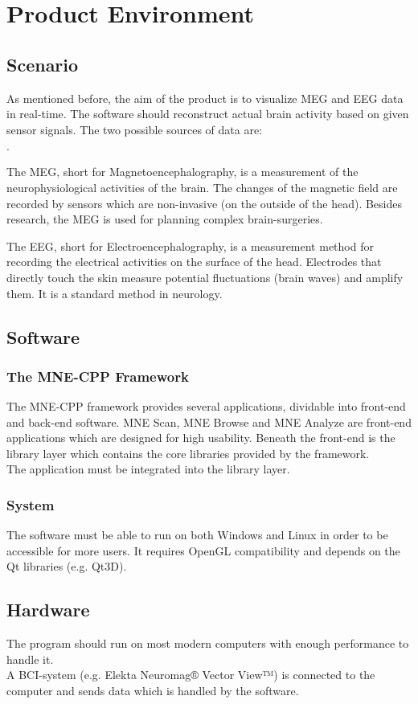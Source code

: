 \section {Product Environment}
\subsection{Scenario}
As mentioned before, the aim of the product is to visualize MEG and EEG data in real-time. The software should reconstruct actual brain activity based on given sensor signals.
The two possible sources of data are:
\begin{list}{$\cdot$}{}

\item The MEG, short for Magnetoencephalography, is a measurement of the neurophysiological activities of the brain. The changes of the magnetic field are recorded by sensors which are non-invasive (on the outside of the head). Besides research, the MEG is used for planning complex brain-surgeries.

\item The EEG, short for Electroencephalography, is a measurement method for recording the electrical activities on the surface of the head. Electrodes that directly touch the skin measure potential fluctuations (brain waves) and amplify them. It is a standard method in neurology.
\end{list}

\subsection{Software}
\subsubsection{The MNE-CPP Framework}The MNE-CPP framework provides several applications, dividable into front-end and back-end software. MNE Scan, MNE Browse and MNE Analyze are front-end applications which are designed for high usability.
Beneath the front-end is the library layer which contains the core libraries provided by the framework.\\
The application must be integrated into the library layer.
\subsubsection{System}
The software must be able to run on both Windows and Linux in order to be accessible for more users. It requires OpenGL compatibility and depends on the Qt libraries (e.g. Qt3D).
\subsection{Hardware}
The program should run on most modern computers with enough performance to handle it. \\
A BCI-system (e.g. Elekta Neuromag® Vector View™) is connected to the computer and sends data which is handled by the software.